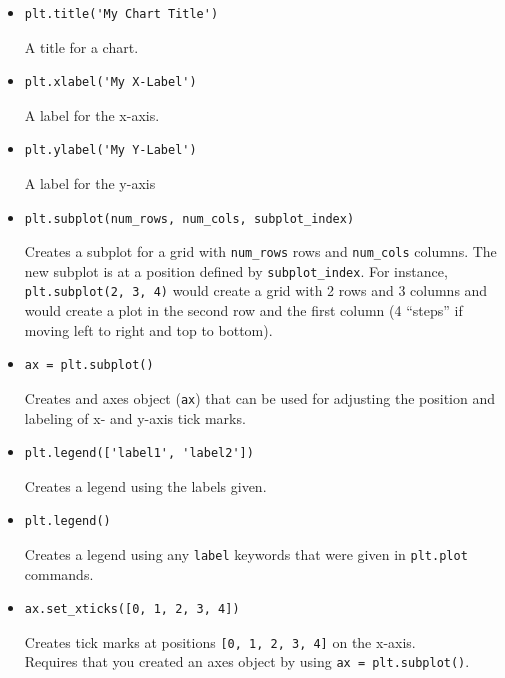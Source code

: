 \documentclass[a4paper]{article}
\begin{document}
\begin{itemize}
\item
\begin{lstlisting}
plt.title('My Chart Title')
\end{lstlisting}
A title for a chart.

\item
\begin{lstlisting}
plt.xlabel('My X-Label')
\end{lstlisting}
A label for the x-axis.

\item
\begin{lstlisting}
plt.ylabel('My Y-Label')
\end{lstlisting}
A label for the y-axis


\item
\begin{lstlisting}
plt.subplot(num_rows, num_cols, subplot_index)
\end{lstlisting}
Creates a subplot for a grid with \texttt{num\_rows} rows and
\texttt{num\_cols} columns. The new subplot is at a position
defined by \texttt{subplot\_index}. For instance,
\texttt{plt.subplot(2, 3, 4)} would create a grid with 2
rows and 3 columns and would create a plot in the
second row and the first column (4 “steps” if moving
left to right and top to bottom).

\item
\begin{lstlisting}
ax = plt.subplot()
\end{lstlisting}
Creates and axes object (\texttt{ax}) that can be used for
adjusting the position and labeling of x- and y-axis
tick marks.

\item
\begin{lstlisting}
plt.legend(['label1', 'label2'])
\end{lstlisting}
Creates a legend using the labels given.

\item
\begin{lstlisting}
plt.legend()
\end{lstlisting}
Creates a legend using any \texttt{label} keywords that
were given in \texttt{plt.plot} commands.

\item
\begin{lstlisting}
ax.set_xticks([0, 1, 2, 3, 4])
\end{lstlisting}
Creates tick marks at positions \texttt{[0, 1, 2, 3, 4]}
on the x-axis. \\
Requires that you created an axes object by using
\texttt{ax = plt.subplot()}.


\end{itemize}
\end{document}
